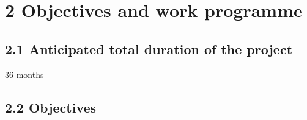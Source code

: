 \documentclass[11pt,a4paper]{article}
\theoremstyle{plain} \newtheorem{define}{Definition}[section]
\begin{document}
{%
%
%
%
%
%
%

\section*{2 Objectives and work programme}

\subsection*{2.1 Anticipated total duration of the project}

36 months

\subsection*{2.2 Objectives}
\label{subsection:ziele}

}
\end{document}
